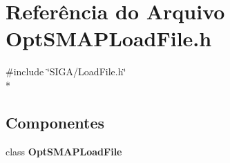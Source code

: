 \section{Referência do Arquivo Opt\+S\+M\+A\+P\+Load\+File.\+h}
\label{_opt_s_m_a_p_load_file_8h}
{\ttfamily \#include \char`\"{}S\+I\+G\+A/\+Load\+File.\+h\char`\"{}}\\*
\subsection*{Componentes}
\begin{DoxyCompactItemize}
\item 
class {\bf Opt\+S\+M\+A\+P\+Load\+File}
\end{DoxyCompactItemize}

